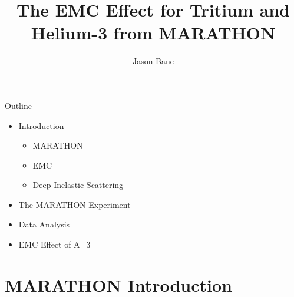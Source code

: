 \documentclass[12pt]{beamer}
\title[EMC A=3]{The EMC Effect for Tritium and Helium-3 from MARATHON} %
\author{Jason Bane} %
\institute[UTK] %
{
University of Tennessee \\ %
\medskip
\textit{jbane1@vols.utk.edu} %
}
\date{} %
\begin{document}
\begin{frame}
	\titlepage %
\end{frame}



\begin{frame}{Outline}

\begin{itemize}
	\item Introduction
	\begin{itemize}
		\item MARATHON
		\item EMC
		\item Deep Inelastic Scattering
	\end{itemize}
	\item The MARATHON Experiment
	\item Data Analysis
	\item EMC Effect of A=3
\end{itemize} 



\end{frame}



\section[MARATHON]{MARATHON Introduction}
\end{document}
